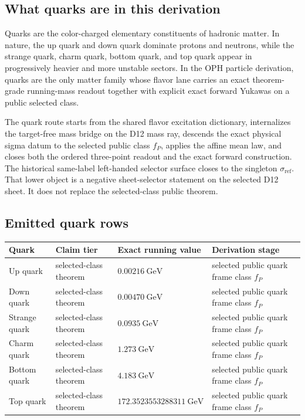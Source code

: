 \documentclass[11pt]{article}
\begin{document}
\subsection{What quarks are in this derivation}

Quarks are the color-charged elementary constituents of hadronic matter. In nature, the up quark
and down quark dominate protons and neutrons, while the strange quark, charm quark, bottom
quark, and top quark appear in progressively heavier and more unstable sectors. In the OPH
particle derivation, quarks are the only matter family whose flavor lane carries an exact
theorem-grade running-mass readout together with explicit exact forward Yukawas on a public
selected class.

The quark route starts from the shared flavor excitation dictionary, internalizes the target-free
mass bridge on the D12 mass ray, descends the exact physical sigma datum to the selected public
class \(f_P\), applies the affine mean law, and closes both the ordered three-point readout and
the exact forward construction. The historical same-label left-handed selector surface closes to
the singleton \(\sigma_{\mathrm{ref}}\). That lower object is a negative sheet-selector statement
on the selected D12 sheet. It does not replace the selected-class public theorem.

\subsection{Emitted quark rows}

\begin{table}[h]
\centering
\small
\begin{tabular}{@{}llll@{}}
\toprule
Quark & Claim tier & Exact running value & Derivation stage \\
\midrule
Up quark & selected-class theorem & \(0.00216~\mathrm{GeV}\) & selected public quark frame class \(f_P\) \\
Down quark & selected-class theorem & \(0.00470~\mathrm{GeV}\) & selected public quark frame class \(f_P\) \\
Strange quark & selected-class theorem & \(0.0935~\mathrm{GeV}\) & selected public quark frame class \(f_P\) \\
Charm quark & selected-class theorem & \(1.273~\mathrm{GeV}\) & selected public quark frame class \(f_P\) \\
Bottom quark & selected-class theorem & \(4.183~\mathrm{GeV}\) & selected public quark frame class \(f_P\) \\
Top quark & selected-class theorem & \(172.3523553288311~\mathrm{GeV}\) & selected public quark frame class \(f_P\) \\
\bottomrule
\end{tabular}
\end{table}
\end{document}
